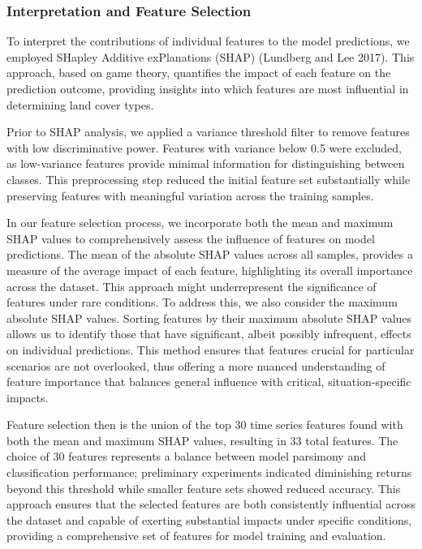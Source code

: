 \documentclass[
  journal,
  twocolumn]{IEEEtran}
\begin{document}
\hypertarget{interpretation-and-feature-selection}{%
\subsubsection{Interpretation and Feature
Selection}\label{interpretation-and-feature-selection}}

To interpret the contributions of individual features to the model
predictions, we employed SHapley Additive exPlanations (SHAP) (Lundberg
and Lee 2017). This approach, based on game theory, quantifies the
impact of each feature on the prediction outcome, providing insights
into which features are most influential in determining land cover
types.

Prior to SHAP analysis, we applied a variance threshold filter to remove
features with low discriminative power. Features with variance below 0.5
were excluded, as low-variance features provide minimal information for
distinguishing between classes. This preprocessing step reduced the
initial feature set substantially while preserving features with
meaningful variation across the training samples.

In our feature selection process, we incorporate both the mean and
maximum SHAP values to comprehensively assess the influence of features
on model predictions. The mean of the absolute SHAP values across all
samples, provides a measure of the average impact of each feature,
highlighting its overall importance across the dataset. This approach
might underrepresent the significance of features under rare conditions.
To address this, we also consider the maximum absolute SHAP values.
Sorting features by their maximum absolute SHAP values allows us to
identify those that have significant, albeit possibly infrequent,
effects on individual predictions. This method ensures that features
crucial for particular scenarios are not overlooked, thus offering a
more nuanced understanding of feature importance that balances general
influence with critical, situation-specific impacts.

Feature selection then is the union of the top 30 time series features
found with both the mean and maximum SHAP values, resulting in 33 total
features. The choice of 30 features represents a balance between model
parsimony and classification performance; preliminary experiments
indicated diminishing returns beyond this threshold while smaller
feature sets showed reduced accuracy. This approach ensures that the
selected features are both consistently influential across the dataset
and capable of exerting substantial impacts under specific conditions,
providing a comprehensive set of features for model training and
evaluation.
\end{document}
